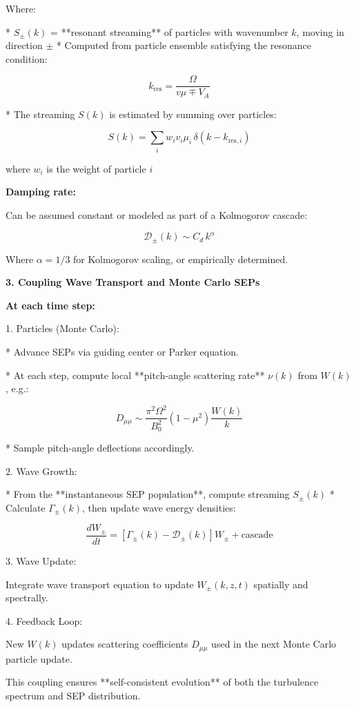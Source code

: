 Where:

* $S_\pm(k)$ = **resonant streaming** of particles with wavenumber $k$, moving in direction $\pm$
* Computed from particle ensemble satisfying the resonance condition:

$$
k_{\text{res}} = \frac{\Omega}{v \mu \mp V_A}
$$

* The streaming $S(k)$ is estimated by summing over particles:

$$
S(k) = \sum_i w_i v_i \mu_i \, \delta\left(k - k_{\text{res},i}\right)
$$

where $w_i$ is the weight of particle $i$

\textbf{ Damping rate:}

Can be assumed constant or modeled as part of a Kolmogorov cascade:

$$
\mathcal{D}_\pm(k) \sim C_d \, k^{\alpha}
$$

Where $\alpha = 1/3$ for Kolmogorov scaling, or empirically determined.



\textbf{ 3. Coupling Wave Transport and Monte Carlo SEPs}


\textbf{ At each time step:}

1. Particles (Monte Carlo):

   * Advance SEPs via guiding center or Parker equation.  
   
   * At each step, compute local **pitch-angle scattering rate** $\nu(k)$ from $W(k)$, e.g.:

     $$
     D_{\mu\mu} \sim \frac{\pi^2 \Omega^2}{B_0^2} \left(1 - \mu^2\right) \frac{W(k)}{k}
     $$
     
   * Sample pitch-angle deflections accordingly.

2. Wave Growth:

   * From the **instantaneous SEP population**, compute streaming $S_\pm(k)$
   * Calculate $\Gamma_\pm(k)$, then update wave energy densities:

     $$
     \frac{dW_\pm}{dt} = \left[ \Gamma_\pm(k) - \mathcal{D}_\pm(k) \right] W_\pm + \text{cascade}
     $$

3. Wave Update:

   Integrate wave transport equation to update $W_\pm(k, z, t)$ spatially and spectrally.

4. Feedback Loop:

   New $W(k)$ updates scattering coefficients $D_{\mu\mu}$ used in the next Monte Carlo particle update.

This coupling ensures **self-consistent evolution** of both the turbulence spectrum and SEP distribution.







